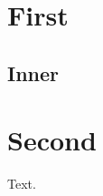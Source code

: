 \documentclass{article}
\begin{document}
\section{First}
\subsection{Inner}
\section{Second}
Text.
\end{document}
